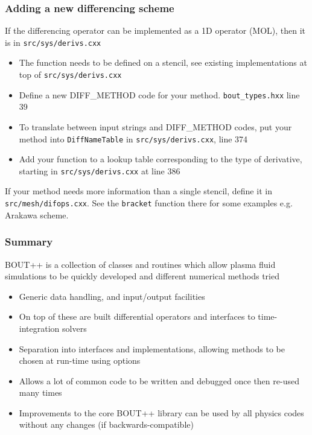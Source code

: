 \documentclass{beamer}
\begin{document}
\begin{frame}
  \frametitle{Adding a new differencing scheme}
  
  If the differencing operator can be implemented as a 1D operator
    (MOL), then it is in \texttt{src/sys/derivs.cxx}
  \begin{itemize}
  \item The function needs to be defined on a stencil, see existing
    implementations at top of \texttt{src/sys/derivs.cxx}
  \item Define a new DIFF\_METHOD code for your method. \texttt{bout\_types.hxx} line 39
  \item To translate between input strings and DIFF\_METHOD codes, put
    your method into \texttt{DiffNameTable} in \texttt{src/sys/derivs.cxx}, line
    374
  \item Add your function to a lookup table
    corresponding to the type of derivative, starting in
    \texttt{src/sys/derivs.cxx} at line 386
  \end{itemize}
  If your method needs more information than a single stencil, 
  define it in \texttt{src/mesh/difops.cxx}. See the \texttt{bracket} function
  there for some examples e.g. Arakawa scheme.
\end{frame}

\begin{frame}
  \frametitle{Summary}
  
  BOUT++ is a collection of classes and routines which
  allow plasma fluid simulations to be quickly developed
  and different numerical methods tried
  
  \begin{itemize}
  \item Generic data handling, and input/output facilities
  \item On top of these are built differential operators and interfaces to
    time-integration solvers
  \item Separation into interfaces and implementations, allowing
    methods to be chosen at run-time using options
  \item Allows a lot of common code to be written and debugged once then
    re-used many times
  \item Improvements to the core BOUT++ library can be used by all physics
    codes without any changes (if backwards-compatible)
  \end{itemize}
\end{frame}
\end{document}
